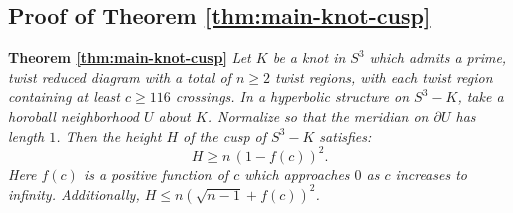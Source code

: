 \subsection{Proof of Theorem \ref{thm:main-knot-cusp}}
\label{subsec:numeric}

\hspace{.1in}

\medskip

\noindent\textbf{Theorem \ref{thm:main-knot-cusp}} \emph{
  Let $K$ be a knot in $S^3$ which admits a prime, twist reduced
  diagram with a total of $n\geq 2$ twist regions, with each twist
  region containing at least $c\geq 116$ crossings.  In a hyperbolic
  structure on $S^3-K$, take a horoball neighborhood $U$ about $K$.
  Normalize so that the meridian on $\partial U$ has length $1$.  Then
  the height $H$ of the cusp of $S^3-K$ satisfies:
  $$H\geq n\,(1-f(c))^2.$$
  Here $f(c)$ is a positive function of $c$ which
  approaches $0$ as $c$ increases to infinity.
Additionally, $H\leq n(\sqrt{n-1} + f(c))^2$.
}


